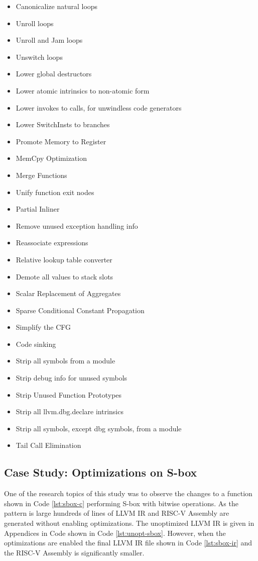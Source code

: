\begin{multicols}{3}
\begin{itemize}
     \item Canonicalize natural loops
     \item Unroll loops
     \item Unroll and Jam loops
     \item Unswitch loops
     \item Lower global destructors
     \item Lower atomic intrinsics to non-atomic form
     \item Lower invokes to calls, for unwindless code generators
     \item Lower SwitchInsts to branches
     \item Promote Memory to Register
     \item MemCpy Optimization
     \item Merge Functions
     \item Unify function exit nodes
     \item Partial Inliner
     \item Remove unused exception handling info
     \item Reassociate expressions
     \item Relative lookup table converter
     \item Demote all values to stack slots
     \item Scalar Replacement of Aggregates
     \item Sparse Conditional Constant Propagation
     \item Simplify the CFG
     \item Code sinking
     \item Strip all symbols from a module
     \item Strip debug info for unused symbols
     \item Strip Unused Function Prototypes
     \item Strip all llvm.dbg.declare intrinsics
     \item Strip all symbols, except dbg symbols, from a module
     \item Tail Call Elimination

\end{itemize}
\end{multicols}

\cite{passes}

\subsection{Case Study: Optimizations on S-box }\label{sbox-case}
One of the research topics of this study was to observe the changes to a function shown in Code \ref{lst:sbox-c} performing S-box with bitwise operations. As the pattern is large hundreds of lines of LLVM IR and RISC-V Assembly are generated without enabling optimizations. The unoptimized LLVM IR is given in Appendices in Code shown in Code \ref{lst:unopt-sbox}. However, when the optimizations are enabled the final LLVM IR file shown in Code \ref{lst:sbox-ir} and the RISC-V Assembly is significantly smaller. 

